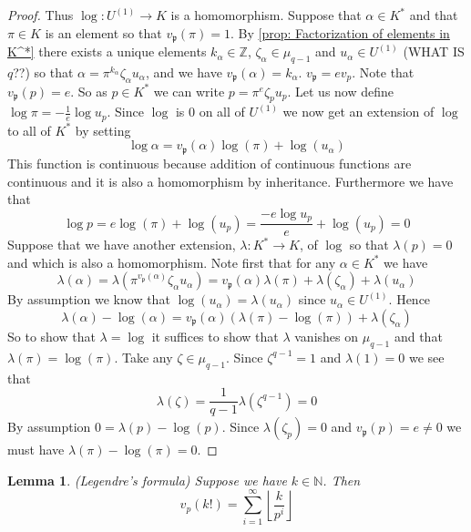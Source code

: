 \documentclass{article}
\newtheorem{lemma}{Lemma}[section]
\newcommand{\mfrak}[1]{\mathfrak{#1}}
\newcommand{\mbb}[1]{\mathbb{#1}}
\begin{document}
\begin{proof}
    
    Thus $\log : U^{(1)} \to K$ is a homomorphism. Suppose that $\alpha \in K^*$ and that $\pi \in K$ is an element so that $v_\mfrak p(\pi) = 1$. By \cref{prop: Factorization of elements in K^*} there exists a unique elements $k_\alpha \in \mbb Z$, $\zeta_\alpha \in \mu_{q-1}$ and $u_\alpha \in U^{(1)}$ (WHAT IS $q$??) so that $\alpha = \pi^{k_\alpha} \zeta_\alpha u_\alpha$, and we have $v_\mfrak p(\alpha) = k_\alpha$. 
    $v_\mfrak p = e v_p$. Note that $v_{\mfrak p} (p) = e$. So as $p \in K^*$ we can write $p = \pi^{e}\zeta_p u_p$. Let us now define $\log \pi = -\frac{1}{e}\log u_p$. Since $\log$ is 0 on all of $U^{(1)}$ we now get an extension of $\log$ to all of $K^*$ by setting
    $$\log \alpha = v_\mfrak p(\alpha)\log(\pi) + \log(u_\alpha)$$
    This function is continuous because addition of continuous functions are continuous and it is also a homomorphism by inheritance. Furthermore we have that
    $$\log p = e\log(\pi) + \log(u_p) = \frac{-e\log u_p}{e} + \log(u_p) = 0 $$
    Suppose that we have another extension, $\lambda : K^* \to K$, of $\log$ so that $\lambda(p) = 0$ and which is also a homomorphism. Note first that for any $\alpha \in K^*$ we have
    $$\lambda(\alpha) = \lambda(\pi^{v_\mfrak p(\alpha)}\zeta_\alpha u_\alpha) = {v_\mfrak p(\alpha)}\lambda(\pi) + \lambda(\zeta_\alpha) + \lambda(u_\alpha)$$ 
    By assumption we know that $\log(u_\alpha) = \lambda(u_\alpha)$ since $u_\alpha \in U^{(1)}$. Hence 
    $$\lambda(\alpha) - \log(\alpha) = {v_\mfrak p(\alpha)}(\lambda(\pi)-\log(\pi))  + \lambda(\zeta_\alpha)$$
    So to show that $\lambda = \log$ it suffices to show that $\lambda$ vanishes on $\mu_{q-1}$ and that $\lambda(\pi) = \log(\pi)$. Take any $\zeta \in \mu_{q-1}$. Since $\zeta^{q-1} = 1$ and $\lambda(1) = 0$ we see that
    $$\lambda(\zeta) = \frac{1}{q-1}\lambda(\zeta^{q-1}) = 0$$
    By assumption $0 = \lambda(p) - \log(p)$. Since $\lambda(\zeta_p) = 0$ and $v_\mfrak p(p) = e \neq 0$ we must have $\lambda(\pi) - \log(\pi) = 0$.
\end{proof}


\begin{lemma}(Legendre's formula)
    Suppose we have $k \in \mbb N$. Then
    $$v_p(k!) = \sum_{i = 1}^{\infty} \left\lfloor \frac{k}{p^i} \right \rfloor$$
\end{lemma}
\end{document}
